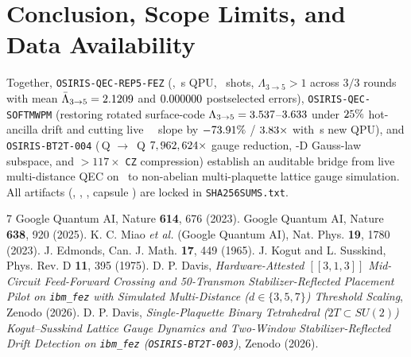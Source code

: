 \documentclass[aps,prx,twocolumn,superscriptaddress,nofootinbib]{revtex4-2}
\begin{document}
\section{Conclusion, Scope Limits, and Data Availability}
Together, \texttt{OSIRIS-QEC-REP5-FEZ} (\rfsRepFiveJobId, \rfsRepFiveQpuSec\,s QPU, \rfsRepFiveTotalShots\ shots, $\Lambda_{3\to 5} > 1$ across $3/3$ rounds with mean $\bar{\Lambda}_{3\to 5} = 2.1209$ and $0.000000$ postselected errors), \texttt{OSIRIS-QEC-SOFTMWPM} (restoring rotated surface-code $\Lambda_{3\to 5} = 3.537$--$3.633$ under $25\%$ hot-ancilla drift and cutting live \rfsBackend\ \rfsSoftFezRepThreeJobId\ slope by $-73.91\%$ / $3.83\times$ with \rfsSimQpuSec\,s new QPU), and \texttt{OSIRIS-BT2T-004} (\rfsBtUnfixedQubits\,Q $\to$ \rfsBtGaugeFixedQubits\,Q $7,962,624\times$ gauge reduction, \rfsBtPhysSubspaceDim-D Gauss-law subspace, and $> 117\times$ \texttt{CZ} compression) establish an auditable bridge from live multi-distance QEC on \rfsBackend\ to non-abelian multi-plaquette lattice gauge simulation. All artifacts (\rfsRepFiveResultsShaPrefix, \rfsSoftRepShaPrefix, \rfsBtManShaPrefix, capsule \rfsCapsuleSha) are locked in \texttt{SHA256SUMS.txt}.

\begin{thebibliography}{7}
 Google Quantum AI, Nature \textbf{614}, 676 (2023).
 Google Quantum AI, Nature \textbf{638}, 920 (2025).
 K. C. Miao \emph{et al.} (Google Quantum AI), Nat. Phys. \textbf{19}, 1780 (2023).
 J. Edmonds, Can. J. Math. \textbf{17}, 449 (1965).
 J. Kogut and L. Susskind, Phys. Rev. D \textbf{11}, 395 (1975).
 D. P. Davis, \emph{Hardware-Attested $[[3,1,3]]$ Mid-Circuit Feed-Forward Crossing and 50-Transmon Stabilizer-Reflected Placement Pilot on \texttt{ibm\_fez} with Simulated Multi-Distance ($d \in \{3, 5, 7\}$) Threshold Scaling}, Zenodo (2026).
 D. P. Davis, \emph{Single-Plaquette Binary Tetrahedral ($2T \subset SU(2)$) Kogut--Susskind Lattice Gauge Dynamics and Two-Window Stabilizer-Reflected Drift Detection on \texttt{ibm\_fez} (\texttt{OSIRIS-BT2T-003})}, Zenodo (2026).
\end{thebibliography}
\end{document}
